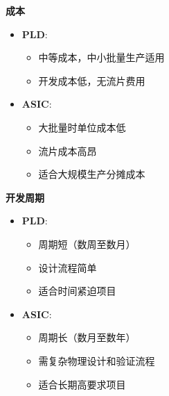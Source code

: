 \documentclass[
  ignorenonframetext,
  chinese,
]{beamer}
\providecommand{\tightlist}{%
  \setlength{\itemsep}{0pt}\setlength{\parskip}{0pt}}
\begin{document}
\begin{frame}
\textbf{成本}

\begin{itemize}
\tightlist
\item
  \textbf{PLD}:

  \begin{itemize}
  \tightlist
  \item
    中等成本，中小批量生产适用\\
  \item
    开发成本低，无流片费用\\
  \end{itemize}
\item
  \textbf{ASIC}:

  \begin{itemize}
  \tightlist
  \item
    大批量时单位成本低\\
  \item
    流片成本高昂\\
  \item
    适合大规模生产分摊成本
  \end{itemize}
\end{itemize}
\end{frame}

\begin{frame}
\textbf{开发周期}

\begin{itemize}
\tightlist
\item
  \textbf{PLD}:

  \begin{itemize}
  \tightlist
  \item
    周期短（数周至数月）\\
  \item
    设计流程简单\\
  \item
    适合时间紧迫项目\\
  \end{itemize}
\item
  \textbf{ASIC}:

  \begin{itemize}
  \tightlist
  \item
    周期长（数月至数年）\\
  \item
    需复杂物理设计和验证流程\\
  \item
    适合长期高要求项目
  \end{itemize}
\end{itemize}
\end{frame}
\end{document}
